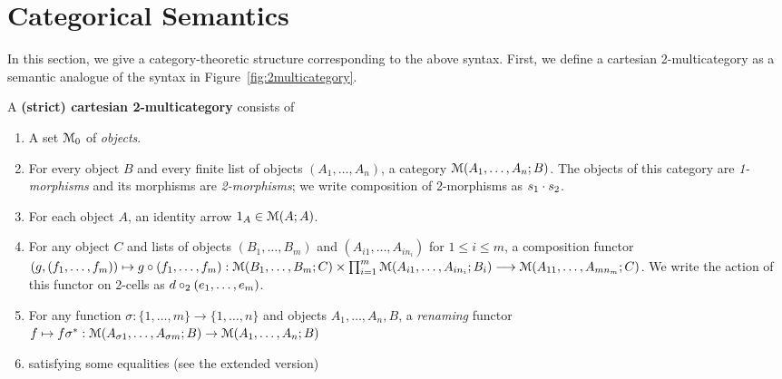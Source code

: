 \newcommand\cD{\ensuremath{\mathcal{D}}}
\newcommand\IndF[3]{\ensuremath{{#1}^\Fsymb_{{#2},{#3}}}}
\newcommand\IndU[4]{\ensuremath{{#1}^\Usymb_{{#2},{#3},{#4}}}}

\section{Categorical Semantics}
\label{sec:semantics}

In this section, we give a category-theoretic structure corresponding to
the above syntax.  First, we define a cartesian 2-multicategory as a
semantic analogue of the syntax in Figure~\ref{fig:2multicategory}. 


\begin{definition}
  A \textbf{(strict) cartesian 2-multicategory} consists of
  \begin{enumerate}
  \item A set $\mathcal{M}_0$ of \emph{objects}.
  \item For every object $B$ and every finite list of objects $(A_1,\dots,A_n)$, a category $\mathcal{M}(A_1,\dots,A_n;B)$.
    The objects of this category are \emph{1-morphisms} and its morphisms are \emph{2-morphisms}; we write composition of 2-morphisms as $s_1 \cdot s_2$.
  \item For each object $A$, an identity arrow $1_A\in\mathcal{M}(A;A)$.
  \item For any object $C$ and lists of objects $(B_1,\dots,B_m)$ and
    $(A_{i1},\dots,A_{in_i})$ for $1\le i\le m$, a composition functor
    $(g,(f_1,\dots,f_m)) \mapsto g\circ (f_1,\dots,f_m) : 
    \mathcal{M}(B_1,\dots,B_m;C) \times \prod_{i=1}^m \mathcal{M}(A_{i1},\dots,A_{in_i};B_i) \longrightarrow \mathcal{M}(A_{11},\dots,A_{mn_m};C)$.
    We write the action of this functor on 2-cells as $d \mathbin{\circ_2} (e_1,\dots,e_m)$.
  \item For any function $\sigma : \{1,\dots,m\} \to \{1,\dots,n\}$ and
    objects $A_1,\dots,A_n,B$, a \emph{renaming} functor $f \mapsto
    f\sigma^* : \mathcal{M}(A_{\sigma 1},\dots,A_{\sigma m}; B) \to \mathcal{M}(A_1,\dots,A_n;B)$
  \item satisfying some equalities (see the extended version)
  \end{enumerate}
\end{definition}

